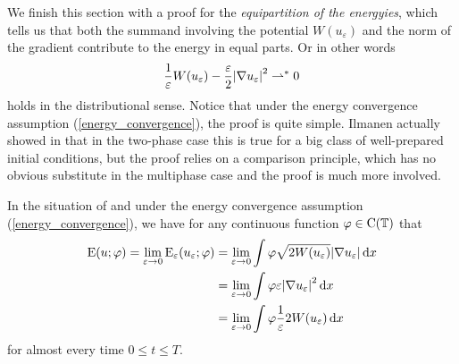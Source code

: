 We finish this section with a proof for the \emph{equipartition of the 
	energyies}, which 
tells us that both the summand involving the potential $ W ( u_{ \varepsilon } 
) $ and the norm of the gradient contribute to the energy in equal parts. Or in 
other words
\begin{equation*}
	\frac{ 1 }{ \varepsilon } W ( u_{ \varepsilon } ) 
	- 
	\frac{ \varepsilon }{ 2 }
	\abs{ \nabla u_{ \varepsilon } }^{ 2 }
	\rightharpoonup^{ \ast }
	0 
\end{equation*}
holds in the distributional sense. Notice that under the 
energy convergence assumption (\ref{energy_convergence}), the proof is quite 
simple. Ilmanen actually showed in 
\cite{ilmanen_convergence_of_ac_to_brakkes_mcf} that in the two-phase case this 
is true
for a big class of well-prepared initial conditions, but the proof relies on a 
comparison principle, which has no obvious substitute in the multiphase case 
and the proof is much more involved.

\begin{lemma}
	\label{equipartition_of_energies}
	In the situation of  and under the energy 
	convergence assumption (\ref{energy_convergence}), we have 
	for any continuous function $ \varphi \in \operatorname{C} ( \operatorname{\mathbb{T}} ) $ 
	that
	\begin{align*}
		\operatorname{E} ( u ; \varphi )
		=
		\lim_{ \varepsilon \to 0 }
		\operatorname{E}_{ \varepsilon } ( u_{ \varepsilon } ; \varphi )
		& = 
		\lim_{ \varepsilon \to 0 }
		\int
		\varphi
		\sqrt{ 2 W ( u_{ \varepsilon } ) }
		\abs{ \nabla u_{ \varepsilon } }
		\dd{ x }
		\\
		& =
		\lim_{ \varepsilon \to 0 }
		\int
		\varphi
		\varepsilon
		\abs{ \nabla u_{ \varepsilon } }^{ 2 }
		\dd{ x}
		\\
		& =
		\lim_{ \varepsilon \to 0 }
		\int
		\varphi
		\frac{ 1 }{ \varepsilon }
		2 W ( u_{ \varepsilon } )
		\dd{ x }
	\end{align*}
	for almost every time $ 0 \leq t \leq T $.
\end{lemma}

